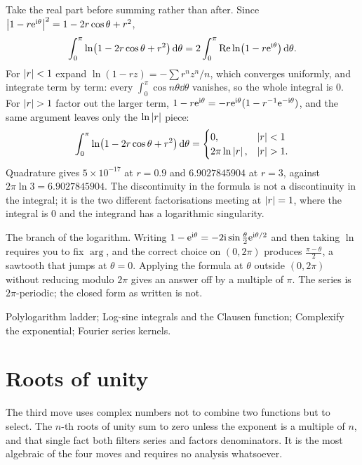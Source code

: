 \begin{worked}
Take the real part before summing rather than after. Since $\left\lvert 1-r\mathrm{e}^{\mathrm{i}\theta}\right\rvert^{2}=1-2r\cos\theta+r^{2}$,
\[\int_0^{\pi}\ln\bigl(1-2r\cos\theta+r^{2}\bigr)\,\mathrm{d}\theta=2\int_0^{\pi}\operatorname{Re}\ln\bigl(1-r\mathrm{e}^{\mathrm{i}\theta}\bigr)\,\mathrm{d}\theta.\]
For $\left\lvert r\right\rvert<1$ expand $\ln(1-rz)=-\sum r^{n}z^{n}/n$, which converges uniformly, and integrate term by term: every $\int_0^{\pi}\cos n\theta\dd\theta$ vanishes, so the whole integral is $0$. For $\left\lvert r\right\rvert>1$ factor out the larger term, $1-r\mathrm{e}^{\mathrm{i}\theta}=-r\mathrm{e}^{\mathrm{i}\theta}(1-r^{-1}\mathrm{e}^{-\mathrm{i}\theta})$, and the same argument leaves only the $\ln\left\lvert r\right\rvert$ piece:
\[\int_0^{\pi}\ln\bigl(1-2r\cos\theta+r^{2}\bigr)\,\mathrm{d}\theta=\begin{cases}0,&\left\lvert r\right\rvert<1\\ 2\pi\ln\left\lvert r\right\rvert,&\left\lvert r\right\rvert>1.\end{cases}\]
Quadrature gives $5\times10^{-17}$ at $r=0.9$ and $6.9027845904$ at $r=3$, against $2\pi\ln3=6.9027845904$. The discontinuity in the formula is not a discontinuity in the integral; it is the two different factorisations meeting at $\left\lvert r\right\rvert=1$, where the integral is $0$ and the integrand has a logarithmic singularity.
\end{worked}

\begin{trap}
The branch of the logarithm. Writing $1-\mathrm{e}^{\mathrm{i}\theta}=-2\mathrm{i}\sin\tfrac\theta2\mathrm{e}^{\mathrm{i}\theta/2}$ and then taking $\ln$ requires you to fix $\arg$, and the correct choice on $(0,2\pi)$ produces $\frac{\pi-\theta}{2}$, a sawtooth that jumps at $\theta=0$. Applying the formula at $\theta$ outside $(0,2\pi)$ without reducing modulo $2\pi$ gives an answer off by a multiple of $\pi$. The series is $2\pi$-periodic; the closed form as written is not.
\end{trap}

\begin{seealsob}Polylogarithm ladder; Log-sine integrals and the Clausen function; Complexify the exponential; Fourier series kernels.\end{seealsob}

\section{Roots of unity}

The third move uses complex numbers not to combine two functions but to select. The $n$-th roots of unity sum to zero unless the exponent is a multiple of $n$, and that single fact both filters series and factors denominators. It is the most algebraic of the four moves and requires no analysis whatsoever.

